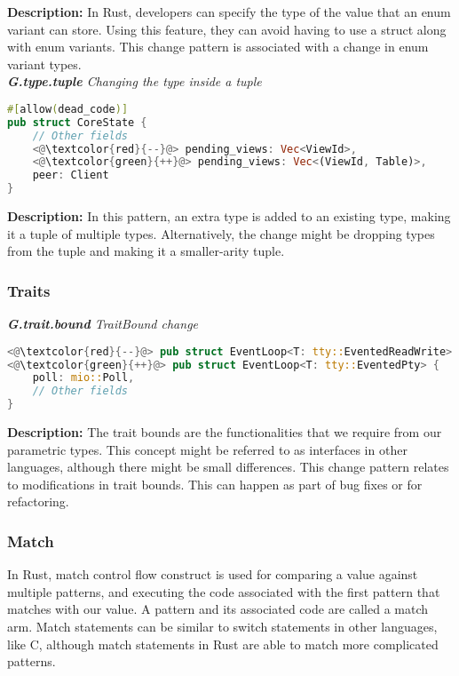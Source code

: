 \noindent\textbf{Description:} In Rust, developers can specify the type of the value that an enum variant can store. Using this feature, they can avoid having to use a struct along with enum variants. This change pattern is associated with a change in enum variant types. \\


\noindent\textit{\textbf{G.type.tuple} Changing the type inside a tuple}

\begin{lstlisting}[language=Rust, style=colouredRust]
#[allow(dead_code)]
pub struct CoreState {
    // Other fields
    <@\textcolor{red}{--}@> pending_views: Vec<ViewId>,
    <@\textcolor{green}{++}@> pending_views: Vec<(ViewId, Table)>,
    peer: Client
}
\end{lstlisting}



\noindent\textbf{Description:} In this pattern, an extra type is added to an existing type, making it a tuple of multiple types. Alternatively, the change might be dropping types from the tuple and making it a smaller-arity tuple.

\subsubsection{Traits}
\noindent\textit{\textbf{G.trait.bound} TraitBound change}

\begin{lstlisting}[language=Rust, style=colouredRust]
<@\textcolor{red}{--}@> pub struct EventLoop<T: tty::EventedReadWrite> {
<@\textcolor{green}{++}@> pub struct EventLoop<T: tty::EventedPty> {
    poll: mio::Poll,
    // Other fields
}

\end{lstlisting}

\noindent\textbf{Description:} The trait bounds are the functionalities that we require from our parametric types. This concept might be referred to as interfaces in other languages, although there might be small differences. This change pattern relates to modifications in trait bounds. This can happen as part of bug fixes or for refactoring. \\

\subsubsection{Match}

In Rust, match control flow construct is used for comparing a value against multiple patterns, and executing the code associated with the first pattern that matches with our value. A pattern and its associated code are called a match arm. Match statements can be similar to switch statements in other languages, like C, although match statements in Rust are able to match more complicated patterns.\\

